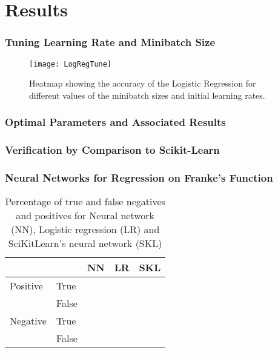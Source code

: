 \section{Results}
\label{sec:results}

\subsubsection{Tuning Learning Rate and Minibatch Size}
\begin{figure}[htbp]
	\centering
	\texttt{[image: LogRegTune]}
	\caption{Heatmap showing the accuracy of the Logistic Regression for different
    values of the minibatch sizes and initial learning rates.}
	\label{fig:TuneLogReg}
\end{figure}


\subsubsection*{Optimal Parameters and Associated Results}

\subsubsection{Verification by Comparison to Scikit-Learn}

\subsubsection{Neural Networks for Regression on Franke's Function}


\begin{table}[htbp]
\caption{Percentage of true and false negatives and positives for Neural network (NN), Logistic regression (LR) and SciKitLearn's neural network (SKL)}
	\begin{tabular}{l  l  r  r  r}
		 & & \textbf{NN} & \textbf{LR} & \textbf{SKL} \\
		 \hline
		Positive & True & & & \\
		 & False & & & \\
		 \hline
		Negative & True & & & \\
		& False &  & & \\
	\end{tabular}
\label{tab:confusion}
\end{table}

\begin{figure}[htbp]
	\centering
	\caption{}
	\label{fig:}
\end{figure}
